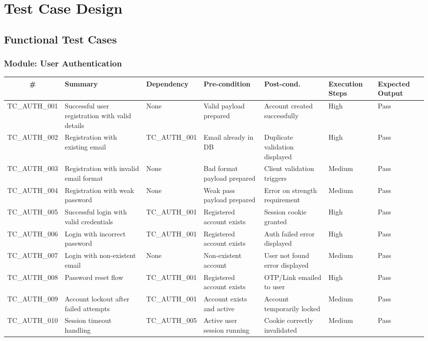 \documentclass[12pt,a4paper]{report}
\begin{document}
\chapter{Test Case Design}

\section{Functional Test Cases}

\subsection{Module: User Authentication}

\begin{longtable}{|c|p{1.8cm}|p{1.4cm}|p{1.8cm}|p{1.8cm}|p{2.2cm}|p{1.6cm}|}
\hline
\textbf{\#} & \textbf{Summary} & \textbf{Dependency} & \textbf{Pre-condition} & \textbf{Post-cond.} & \textbf{Execution Steps} & \textbf{Expected Output} \\
\hline
\endfirsthead
TC\_AUTH\_001 & Successful user registration with valid details & None & Valid payload prepared & Account created successfully & High & Pass \\
\hline
TC\_AUTH\_002 & Registration with existing email & TC_AUTH_001 & Email already in DB & Duplicate validation displayed & High & Pass \\
\hline
TC\_AUTH\_003 & Registration with invalid email format & None & Bad format payload prepared & Client validation triggers & Medium & Pass \\
\hline
TC\_AUTH\_004 & Registration with weak password & None & Weak pass payload prepared & Error on strength requirement & Medium & Pass \\
\hline
TC\_AUTH\_005 & Successful login with valid credentials & TC_AUTH_001 & Registered account exists & Session cookie granted & High & Pass \\
\hline
TC\_AUTH\_006 & Login with incorrect password & TC_AUTH_001 & Registered account exists & Auth failed error displayed & High & Pass \\
\hline
TC\_AUTH\_007 & Login with non-existent email & None & Non-existent account & User not found error displayed & Medium & Pass \\
\hline
TC\_AUTH\_008 & Password reset flow & TC_AUTH_001 & Registered account exists & OTP/Link emailed to user & High & Pass \\
\hline
TC\_AUTH\_009 & Account lockout after failed attempts & TC_AUTH_001 & Account exists and active & Account temporarily locked & Medium & Pass \\
\hline
TC\_AUTH\_010 & Session timeout handling & TC_AUTH_005 & Active user session running & Cookie correctly invalidated & Medium & Pass \\
\hline
\end{longtable}
\end{document}

